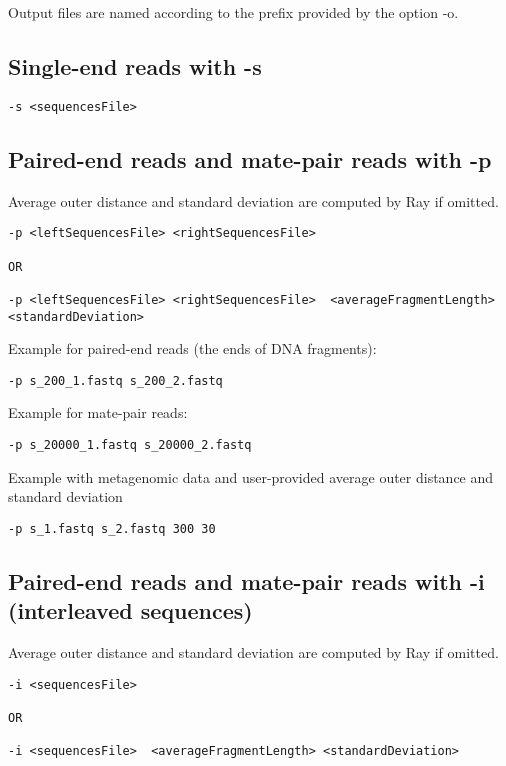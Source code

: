 \documentclass{article}
\begin{document}
Output files are named according to the prefix provided by the option -o.

\subsection{Single-end reads with -s}

\begin{verbatim}
-s <sequencesFile>
\end{verbatim}

\subsection{Paired-end reads and mate-pair reads with -p}

Average outer distance and standard deviation are computed by Ray if omitted.

\begin{verbatim}
-p <leftSequencesFile> <rightSequencesFile>  

OR

-p <leftSequencesFile> <rightSequencesFile>  <averageFragmentLength> <standardDeviation> 
\end{verbatim}

Example for paired-end reads (the ends of DNA fragments):

\begin{verbatim}
-p s_200_1.fastq s_200_2.fastq
\end{verbatim}

Example for mate-pair reads:

\begin{verbatim}
-p s_20000_1.fastq s_20000_2.fastq
\end{verbatim}

Example with metagenomic data and user-provided average outer distance and standard deviation

\begin{verbatim}
-p s_1.fastq s_2.fastq 300 30
\end{verbatim}

\subsection{Paired-end reads and mate-pair reads with -i (interleaved sequences)}


Average outer distance and standard deviation are computed by Ray if omitted.

\begin{verbatim}
-i <sequencesFile>

OR

-i <sequencesFile>  <averageFragmentLength> <standardDeviation> 
\end{verbatim}
\end{document}
